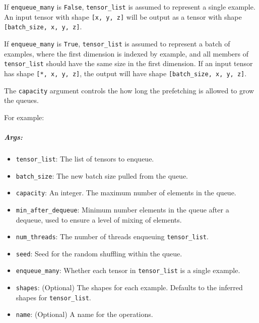If \texttt{enqueue\_many} is \texttt{False}, \texttt{tensor\_list} is
assumed to represent a single example. An input tensor with shape
\texttt{{[}x,\ y,\ z{]}} will be output as a tensor with shape
\texttt{{[}batch\_size,\ x,\ y,\ z{]}}.

If \texttt{enqueue\_many} is \texttt{True}, \texttt{tensor\_list} is
assumed to represent a batch of examples, where the first dimension is
indexed by example, and all members of \texttt{tensor\_list} should have
the same size in the first dimension. If an input tensor has shape
\texttt{{[}*,\ x,\ y,\ z{]}}, the output will have shape
\texttt{{[}batch\_size,\ x,\ y,\ z{]}}.

The \texttt{capacity} argument controls the how long the prefetching is
allowed to grow the queues.

For example:

\begin{Shaded}
\begin{Highlighting}[]
\OperatorTok{=} 
      \OperatorTok{=}\NormalTok{,}
      \OperatorTok{=}\NormalTok{,}
      \OperatorTok{=}\NormalTok{,}
      \OperatorTok{=}\NormalTok{)}
\end{Highlighting}
\end{Shaded}

\subparagraph{Args: }\label{args-65}

\begin{itemize}
\tightlist
\item
  \texttt{tensor\_list}: The list of tensors to enqueue.
\item
  \texttt{batch\_size}: The new batch size pulled from the queue.
\item
  \texttt{capacity}: An integer. The maximum number of elements in the
  queue.
\item
  \texttt{min\_after\_dequeue}: Minimum number elements in the queue
  after a dequeue, used to ensure a level of mixing of elements.
\item
  \texttt{num\_threads}: The number of threads enqueuing
  \texttt{tensor\_list}.
\item
  \texttt{seed}: Seed for the random shuffling within the queue.
\item
  \texttt{enqueue\_many}: Whether each tensor in \texttt{tensor\_list}
  is a single example.
\item
  \texttt{shapes}: (Optional) The shapes for each example. Defaults to
  the inferred shapes for \texttt{tensor\_list}.
\item
  \texttt{name}: (Optional) A name for the operations.
\end{itemize}

